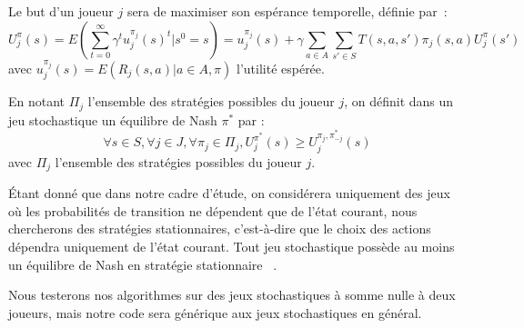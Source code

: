 \documentclass{article}
\begin{document}
Le but d'un joueur \(j\) sera de maximiser son espérance temporelle, définie par~:
\[U_j^\pi(s) = E(\sum\limits_{t=0}^\infty \gamma^t u_j^{\pi_j}(s)^t | s^0=s) = u_j^{\pi_j}(s) + \gamma \sum\limits_{a \in A}\sum\limits_{s' \in S}T(s,a,s')\pi_j(s,a)U_j^\pi(s')\] avec \(u_j^{\pi_j}(s) = E(R_j(s, a)|a \in A, \pi)\) l'utilité espérée.

En notant \(\Pi_j\) l'ensemble des stratégies possibles du joueur \(j\), on définit dans un jeu stochastique un équilibre de Nash \(\pi^*\) par :  \[\forall s \in S,   \forall j \in J,   \forall \pi_j \in \Pi_j,   U_j^{\pi^*}(s) \geq U_j^{\pi_j, \pi^*_{-j}}(s)\] avec \(\Pi_j\) l'ensemble des stratégies possibles du joueur \(j\).

Étant donné que dans notre cadre d’étude, on considérera uniquement des jeux où les probabilités de transition ne dépendent que de l’état courant, nous chercherons des stratégies stationnaires, c'est-à-dire que le choix des actions dépendra uniquement de l'état courant. Tout jeu stochastique possède au moins un équilibre de Nash en stratégie stationnaire ~\cite{pdmia}.

Nous testerons nos algorithmes sur des jeux stochastiques à somme nulle à deux joueurs, mais notre code sera générique aux jeux stochastiques en général.
\end{document}
